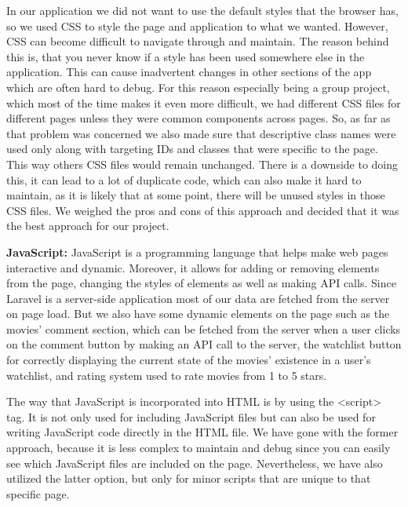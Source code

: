 In our application we did not want to use the default styles that the browser has, so we used CSS to style the page and application to what we wanted.
However, CSS can become difficult to navigate through and maintain.
The reason behind this is, that you never know if a style has been used somewhere else in the application.
This can cause inadvertent changes in other sections of the app which are often hard to debug.
For this reason especially being a group project, which most of the time makes it even more difficult, we had different CSS files for different pages unless they were common components across pages.
So, as far as that problem was concerned we also made sure that descriptive class names were used only along with targeting IDs and classes that were specific to the page.
This way others CSS files would remain unchanged.
There is a downside to doing this, it can lead to a lot of duplicate code, which can also make it hard to maintain, as it is likely that at some point, there will be unused styles in those CSS files.
We weighed the pros and cons of this approach and decided that it was the best approach for our project.\newline

\textbf{JavaScript:} \newline
JavaScript is a programming language that helps make web pages interactive and dynamic. Moreover, it allows for adding or removing elements from the page, changing the styles of elements as well as making API calls.
Since Laravel is a server-side application most of our data are fetched from the server on page load.
But we also have some dynamic elements on the page such as the movies' comment section, which can be 
fetched from the server when a user clicks on the comment button by making an API call to the server, the watchlist button for 
correctly displaying the current state of the movies' existence in a user's watchlist, and rating system used to rate movies from 1 to 5 stars.\newline

The way that JavaScript is incorporated into HTML is by using the \textless{}script\textgreater{} tag. It is not only used for including JavaScript files but can also be used for writing JavaScript code directly in the HTML file.
We have gone with the former approach, because it is less complex to maintain and debug since you can easily see which JavaScript files are included on the page.
Nevertheless, we have also utilized the latter option, but only for minor scripts that are unique to that specific page.\newline